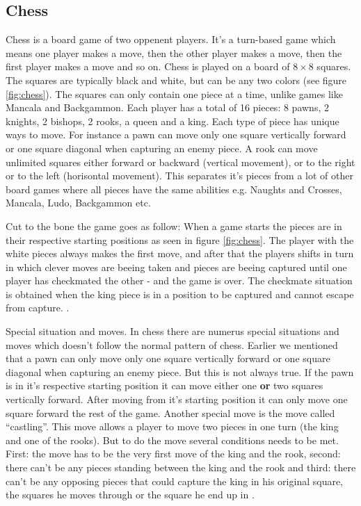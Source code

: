 \subsection{Chess}
Chess is a board game of two oppenent players. It's a turn-based game which means one player makes a move, 
then the other player makes a move, then the first player makes a move and so on. Chess is played on a board of $8 \times 8$ squares. The squares are typically black and white, but can be any two colors (see figure \ref{fig:chess}). The squares can only contain one piece at a time, unlike games like Mancala and Backgammon. Each player has a total of 16 pieces: 8 pawns, 2 knights, 2 bishops, 2 rooks, a queen and a king. Each type of piece has unique ways to move. For instance a pawn can move only one square vertically forward or one square diagonal when capturing an enemy piece. A rook can move unlimited squares either forward or backward (vertical movement), or to the right or to the left (horisontal movement). This separates it's pieces from a lot of other board games where all pieces have the same abilities e.g. Naughts and Crosses, Mancala, Ludo, Backgammon etc.  

Cut to the bone the game goes as follow: When a game starts the pieces are in their respective starting positions as seen in figure \ref{fig:chess}. The player with the white pieces always makes the first move, and after that the players shifts in turn in which clever moves are beeing taken and pieces are beeing captured until one player has checkmated the other - and the game is over. The checkmate situation is obtained when the king piece is in a position to be captured and cannot escape from capture. \cite{chessrules}.

Special situation and moves. In chess there are numerus special situations and moves which doesn't follow the normal pattern of chess. Earlier we mentioned that a pawn can only move only one square vertically forward or one square diagonal when capturing an enemy piece. But this is not always true. If the pawn is in it's respective starting position it can move either one \textbf{or} two squares vertically forward. After moving from it's starting position it can only move one square forward the rest of the game. Another special move is the move called ``castling''. This move allows a player to move two pieces in one turn (the king and one of the rooks). But to do the move several conditions needs to be met. First: the move has to be the very first move of the king and the rook, second: there can't be any pieces standing between the king and the rook and third: there can't be any opposing pieces that could capture the king in his original square, the squares he moves through or the square he end up in \cite{chessrules}.


